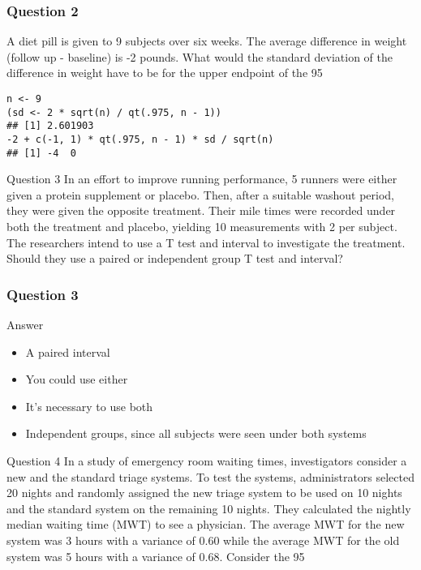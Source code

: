 \begin{frame}
\frametitle{Question 2}
A diet pill is given to 9 subjects over six weeks. The average difference in weight (follow up - baseline) is -2 pounds. What would the standard deviation of the difference in weight have to be for the upper endpoint of the 95%

\begin{framed}
\begin{verbatim}
n <- 9
(sd <- 2 * sqrt(n) / qt(.975, n - 1))
## [1] 2.601903
-2 + c(-1, 1) * qt(.975, n - 1) * sd / sqrt(n)
## [1] -4  0
\end{verbatim}
\end{framed}
\end{frame}
\begin{frame}
Question 3
In an effort to improve running performance, 5 runners were either given a protein supplement or placebo. Then, after a suitable washout period, they were given the opposite treatment. Their mile times were recorded under both the treatment and placebo, yielding 10 measurements with 2 per subject. The researchers intend to use a T test and interval to investigate the treatment. Should they use a paired or independent group T test and interval?
\end{frame}
\begin{frame}
\frametitle{Question 3}
Answer

\begin{itemize}
\item A paired interval
\item You could use either
\item It’s necessary to use both
\item Independent groups, since all subjects were seen under both systems
\end{itemize}
\end{frame}
\begin{frame}
Question 4
In a study of emergency room waiting times, investigators consider a new and the standard triage systems. To test the systems, administrators selected 20 nights and randomly assigned the new triage system to be used on 10 nights and the standard system on the remaining 10 nights. They calculated the nightly median waiting time (MWT) to see a physician. The average MWT for the new system was 3 hours with a variance of 0.60 while the average MWT for the old system was 5 hours with a variance of 0.68. Consider the 95%

\end{frame}
